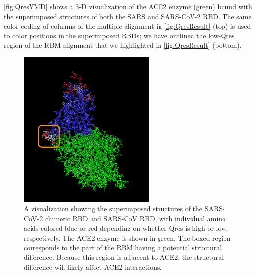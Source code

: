 \autoref{fig:QresVMD} shows a 3-D visualization of the ACE2 enzyme (green) bound with the superimposed structures of both the SARS and SARS-CoV-2 RBD. The same color-coding of columns of the multiple alignment in \autoref{fig:QresResult} (top) is used to color positions in the superimposed RBDs; we have outlined the low-Qres region of the RBM alignment that we highlighted in \autoref{fig:QresResult} (bottom).\\

\begin{figure}[h]
	\centering
	\mySfFamily
	\includegraphics[width = 0.6\textwidth]{../images/QresVMD.png}
	\caption{A visualization showing the superimposed structures of the SARS-CoV-2 chimeric RBD  and SARS-CoV RBD, with individual amino acids colored blue or red depending on whether Qres is high or low, respectively.  The ACE2 enzyme is shown in green. The boxed region corresponds to the part of the RBM having a potential structural difference. Because this region is adjacent to ACE2, the structural difference will likely affect ACE2 interactions.}
	\label{fig:QresVMD}
\end{figure}

\begin{note}\end{note}

